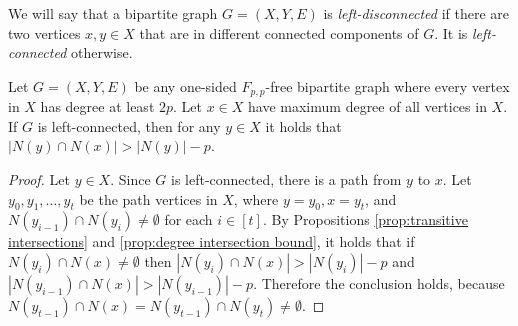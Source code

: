 \documentclass{article}
\begin{document}
We will say that a bipartite graph $G = (X,Y,E)$ is \emph{left-disconnected} if there are two
vertices $x,y \in X$ that are in different connected components of $G$. It is \emph{left-connected} otherwise.

\begin{proposition}
\label{prop:highest degree connected}
Let $G = (X,Y,E)$ be any one-sided $F_{p,p}$-free bipartite graph where every vertex in $X$ has degree at least $2p$. Let $x \in X$ have maximum degree of all vertices in $X$. If $G$ is left-connected, then for any $y \in X$ it holds that $|N(y) \cap N(x)| > |N(y)|-p$.
\end{proposition}
\begin{proof}
Let $y \in X$. Since $G$ is left-connected, there is a path from $y$ to $x$. Let $y_0,y_1,\dotsc,y_t$ be
the path vertices in $X$, where $y=y_0,x=y_t$, and $N(y_{i-1}) \cap N(y_i) \neq \emptyset$ for each
$i \in [t]$. By Propositions \ref{prop:transitive intersections} and \ref{prop:degree intersection
bound}, it holds that if $N(y_i) \cap N(x) \neq \emptyset$ then $|N(y_i) \cap N(x)| > |N(y_i)|-p$
and $|N(y_{i-1}) \cap N(x)| > |N(y_{i-1})|-p$. Therefore the conclusion holds, because $N(y_{t-1})
\cap N(x) = N(y_{t-1}) \cap N(y_t) \neq \emptyset$.
\end{proof}
\end{document}
